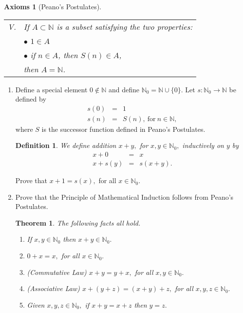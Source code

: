\documentclass[11pt]{article}
\newcommand{\bbN}{\mathbb{N}}
\newtheorem*{theorem}{Theorem}
\newtheorem*{axioms}{Axioms}
\newtheorem*{definition}{Definition}
\begin{document}
\begin{enumerate}
\begin{axioms}[Peano's Postulates]
\begin{tabular}{ll}
V. &  If $A\subset {\mathbb N}$ is a subset satisfying the two properties: \\
& \phantom{MMM}  $\bullet$ $1\in A$ \\

& \phantom{MMM} $\bullet$ if $n\in A$, then $S(n)\in A$, \\

& then $A={\mathbb N}$. \\
\end{tabular}
\end{axioms}

\begin{enumerate}





\item  

Define a special element $0\not\in\bbN$ and define $\bbN_0=\bbN\cup\{0\}.$  Let $s:\bbN_0 \longrightarrow \bbN$ be defined by 
\begin{eqnarray*}
s(0) & = & 1\\
s(n) & = & S(n),\ \text{for}\ n\in\bbN,
\end{eqnarray*}
where $S$ is the successor function defined in Peano's Postulates.

\begin{definition}
We define addition $x+y,$ for $x,y\in \bbN_0,$ inductively on $y$ by 
\begin{eqnarray*}
x+0 & = & x\\
x+s(y) & = & s(x+y).
\end{eqnarray*}
\end{definition}

Prove that $x+1=s(x),$ for all $x\in \bbN_0.$

\item Prove that the Principle of Mathematical Induction follows from Peano's Postulates.


\begin{theorem} The following facts all hold.  
 \begin{enumerate}
 \item If $x,y\in \bbN_0$ then  $x+y\in  \bbN_0.$
 \item $0+x=x,$ for all $x\in \bbN_0.$
 \item (Commutative Law) $x+y=y+x,$ for all $x,y\in  \bbN_0.$
 \item (Associative Law) $x+(y+z)=(x+y)+z,$ for all $x,y,z\in  \bbN_0.$
 \item Given $x,y,z\in\bbN_0,$ if  $x+y=x+z$ then $y=z.$
 \end{enumerate} 
 \end{theorem}
 

\end{enumerate}
\end{enumerate}
\end{document}
